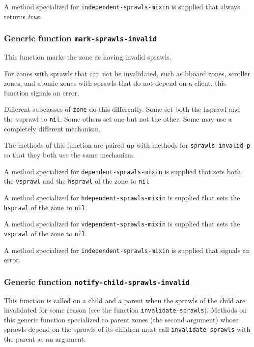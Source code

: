 \documentclass{report}
\begin{document}
A method specialized for \texttt{independent-sprawls-mixin} is supplied
that always returns \emph{true}. 

\subsubsection{Generic function \texttt{mark-sprawls-invalid}}
\label{generic-function-mark-sprawls-invalid}

This function marks the zone as having invalid sprawls.  

For zones with sprawls that can not be invalidated, such as bboard
zones, scroller zones, and atomic zones with sprawls that do not depend
on a client, this function signals an error.

Different subclasses of \texttt{zone} do this differently.  Some set
both the hsprawl and the vsprawl to \texttt{nil}.  Some others set one but
not the other.  Some may use a completely different mechanism.

The methods of this function are paired up with methods for
\texttt{sprawls-invalid-p} so that they both use the same mechanism.

A method specialized for \texttt{dependent-sprawls-mixin} is supplied
that sets both the \texttt{vsprawl} and the \texttt{hsprawl} of the zone
to \texttt{nil}

A method specialized for \texttt{hdependent-sprawls-mixin} is supplied
that sets the \texttt{hsprawl} of the zone to \texttt{nil}.

A method specialized for \texttt{vdependent-sprawls-mixin} is supplied
that sets the \texttt{vsprawl} of the zone to \texttt{nil}.

A method specialized for \texttt{independent-sprawls-mixin} is supplied
that signals an error.

\subsubsection{Generic function \texttt{notify-child-sprawls-invalid}}
\label{generic-function-notify-child-sprawls-invalid}

This function is called on a child and a parent when the sprawls of the
child are invalidated for some reason (see the function
\texttt{invalidate-sprawls}).  Methods on this generic function
specialized to parent zones (the second argument) whose sprawls depend
on the sprawls of its children must call \texttt{invalidate-sprawls} with
the parent as an argument.
\end{document}
